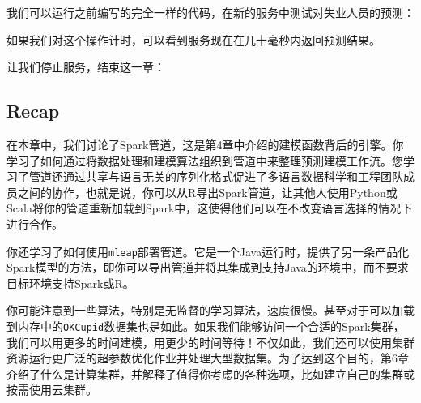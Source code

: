 \documentclass[
]{article}
\newenvironment{Shaded}{\begin{snugshade}}{\end{snugshade}}
\newcommand{\DataTypeTok}[1]{\textcolor[rgb]{0.13,0.29,0.53}{#1}}
\newcommand{\DecValTok}[1]{\textcolor[rgb]{0.00,0.00,0.81}{#1}}
\newcommand{\KeywordTok}[1]{\textcolor[rgb]{0.13,0.29,0.53}{\textbf{#1}}}
\newcommand{\NormalTok}[1]{#1}
\newcommand{\OperatorTok}[1]{\textcolor[rgb]{0.81,0.36,0.00}{\textbf{#1}}}
\newcommand{\StringTok}[1]{\textcolor[rgb]{0.31,0.60,0.02}{#1}}
\begin{document}
我们可以运行之前编写的完全一样的代码，在新的服务中测试对失业人员的预测：

\begin{Shaded}
\end{Shaded}

如果我们对这个操作计时，可以看到服务现在在几十毫秒内返回预测结果。

让我们停止服务，结束这一章：

\begin{Shaded}
\end{Shaded}

\hypertarget{recap}{%
\subsection{Recap}\label{recap}}

在本章中，我们讨论了Spark管道，这是第4章中介绍的建模函数背后的引擎。你学习了如何通过将数据处理和建模算法组织到管道中来整理预测建模工作流。您学习了管道还通过共享与语言无关的序列化格式促进了多语言数据科学和工程团队成员之间的协作，也就是说，你可以从R导出Spark管道，让其他人使用Python或Scala将你的管道重新加载到Spark中，这使得他们可以在不改变语言选择的情况下进行合作。

你还学习了如何使用\texttt{mleap}部署管道。它是一个Java运行时，提供了另一条产品化Spark模型的方法，即你可以导出管道并将其集成到支持Java的环境中，而不要求目标环境支持Spark或R。

你可能注意到一些算法，特别是无监督的学习算法，速度很慢。甚至对于可以加载到内存中的\texttt{OKCupid}数据集也是如此。如果我们能够访问一个合适的Spark集群，我们可以用更多的时间建模，用更少的时间等待！不仅如此，我们还可以使用集群资源运行更广泛的超参数优化作业并处理大型数据集。为了达到这个目的，第6章介绍了什么是计算集群，并解释了值得你考虑的各种选项，比如建立自己的集群或按需使用云集群。
\end{document}
